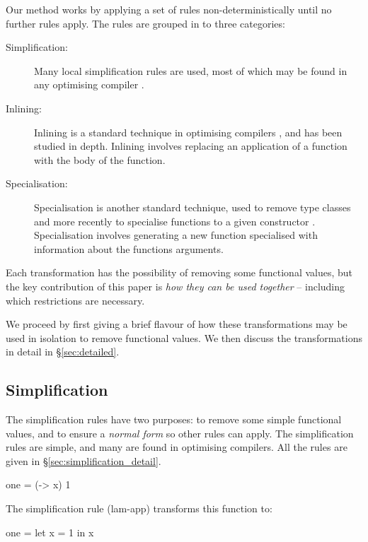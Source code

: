 \documentclass{sigplanconf}
\begin{document}
Our method works by applying a set of rules non-deterministically until no further rules apply. The rules are grouped in to three categories:

\begin{description}
\item[Simplification:] Many local simplification rules are used, most of which may be found in any optimising compiler \cite{spj:transformation}.
\item[Inlining:] Inlining is a standard technique in optimising compilers \cite{spj:inlining}, and has been studied in depth. Inlining involves replacing an application of a function with the body of the function.
\item[Specialisation:] Specialisation is another standard technique, used to remove type classes \cite{jones:dictionary_free} and more recently to specialise functions to a given constructor \cite{spj:specconstr}. Specialisation involves generating a new function specialised with information about the functions arguments.
\end{description}

Each transformation has the possibility of removing some functional values, but the key contribution of this paper is \textit{how they can be used together} -- including which restrictions are necessary.

We proceed by first giving a brief flavour of how these transformations may be used in isolation to remove functional values. We then discuss the transformations in detail in \S\ref{sec:detailed}.

\subsection{Simplification}

The simplification rules have two purposes: to remove some simple functional values, and to ensure a \textit{normal form} so other rules can apply. The simplification rules are simple, and many are found in optimising compilers. All the rules are given in \S\ref{sec:simplification_detail}.

\begin{example}
\begin{code}
one = (\x -> x) 1
\end{code}

\noindent The simplification rule (lam-app) transforms this function to:

\begin{code}
one = let x = 1 in x
\end{code}\codeexample
\end{example}\smallskip
\end{document}
